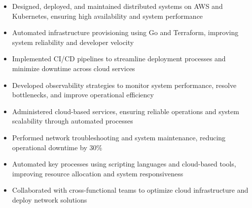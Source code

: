\par\bigskip
{}
\par\smallskip
\begin{minipage}{13.75cm}
  \begin{minipage}{6.5cm}
    \begin{itemize}
      \item Designed, deployed, and maintained distributed systems on AWS and Kubernetes, ensuring high availability and system performance
      \item Automated infrastructure provisioning using Go and Terraform, improving system reliability and developer velocity
    \end{itemize}
  \end{minipage}
  \hfill
  \begin{minipage}{6.5cm}
    \begin{itemize}
      \item Implemented CI/CD pipelines to streamline deployment processes and minimize downtime across cloud services
      \item Developed observability strategies to monitor system performance, resolve bottlenecks, and improve operational efficiency
    \end{itemize}
  \end{minipage}
\end{minipage}
\par\smallskip
\divider

\par\smallskip
\begin{minipage}{13.75cm}
  \begin{minipage}{6.5cm}
    \begin{itemize}
      \item Administered cloud-based services, ensuring reliable operations and system scalability through automated processes
      \item Performed network troubleshooting and system maintenance, reducing operational downtime by 30\%
    \end{itemize}
  \end{minipage}
  \hfill
  \begin{minipage}{6.5cm}
    \begin{itemize}
      \item Automated key processes using scripting languages and cloud-based tools, improving resource allocation and system responsiveness
      \item Collaborated with cross-functional teams to optimize cloud infrastructure and deploy network solutions
    \end{itemize}
  \end{minipage}
\end{minipage}

